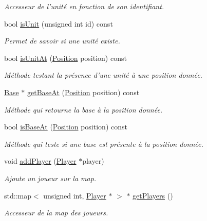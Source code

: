 \begin{DoxyCompactItemize}
\begin{DoxyCompactList}\small\item\em Accesseur de l'unité en fonction de son identifiant. \end{DoxyCompactList}\item 
bool \hyperlink{classMap_a150dfa9e7f3c31e8f7b8bdba6fe4a433}{is\+Unit} (unsigned int id) const 
\begin{DoxyCompactList}\small\item\em Permet de savoir si une unité existe. \end{DoxyCompactList}\item 
bool \hyperlink{classMap_ac1383a7aa9471f09d4a2f8708d872008}{is\+Unit\+At} (\hyperlink{classPosition}{Position} position) const 
\begin{DoxyCompactList}\small\item\em Méthode testant la présence d'une unité à une position donnée. \end{DoxyCompactList}\item 
\hyperlink{classBase}{Base} $\ast$ \hyperlink{classMap_a1943a0744e258950e341d368bdaec868}{get\+Base\+At} (\hyperlink{classPosition}{Position} position) const 
\begin{DoxyCompactList}\small\item\em Méthode qui retourne la base à la position donnée. \end{DoxyCompactList}\item 
bool \hyperlink{classMap_ad89412c547ebdcdd0831a8a7700c3f18}{is\+Base\+At} (\hyperlink{classPosition}{Position} position) const 
\begin{DoxyCompactList}\small\item\em Méthode qui teste si une base est présente à la position donnée. \end{DoxyCompactList}\item 
void \hyperlink{classMap_aee81c8e1fdb01828b733d392f5c1e068}{add\+Player} (\hyperlink{classPlayer}{Player} $\ast$player)
\begin{DoxyCompactList}\small\item\em Ajoute un joueur sur la map. \end{DoxyCompactList}\item 
std\+::map$<$ unsigned int, \hyperlink{classPlayer}{Player} $\ast$ $>$ $\ast$ \hyperlink{classMap_a8e1b744435056e5fff197956d1cfdfb7}{get\+Players} ()
\begin{DoxyCompactList}\small\item\em Accesseur de la map des joueurs. \end{DoxyCompactList}\item 

\end{DoxyCompactItemize}
